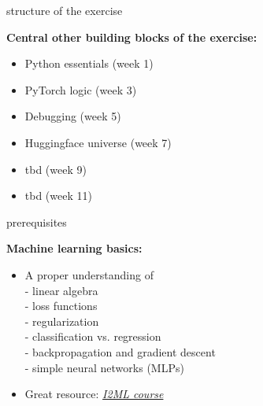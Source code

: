\begin{vbframe}{structure of the exercise}

\vfill

\textbf{Central other building blocks of the exercise:}

	\begin{itemize}
		\item Python essentials (week 1)
		\item PyTorch logic (week 3)
		\item Debugging (week 5)
		\item Huggingface universe (week 7)
		\item tbd (week 9)
		\item tbd (week 11)
	\end{itemize}

\vfill

\end{vbframe}


\begin{vbframe}{prerequisites}
	
\vfill
	
\textbf{Machine learning basics:}

		\begin{itemize}
				\item A proper understanding of\\
				- linear algebra\\
				- loss functions\\
				- regularization\\
				- classification vs. regression\\
				- backpropagation and gradient descent\\
				- simple neural networks (MLPs)
				\item Great resource: \href{https://slds-lmu.github.io/i2ml/}{\textit{I2ML course}}
		\end{itemize}

\vfill

\end{vbframe}



